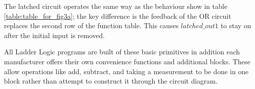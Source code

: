 The latched circuit operates the same way as the behaviour show in table \ref{table:table_for_fig3a}; the key difference is the feedback of the OR circuit replaces the second row of the function table. This causes $latched\_out1$ to stay on after the initial input is removed.

All Ladder Logic programs are built of these basic primitives in addition each manufacturer offers their own convenience functions and additional blocks. These allow operations like add, subtract, and taking a measurement to be done in one block rather than attempt to construct it through the circuit diagram.
